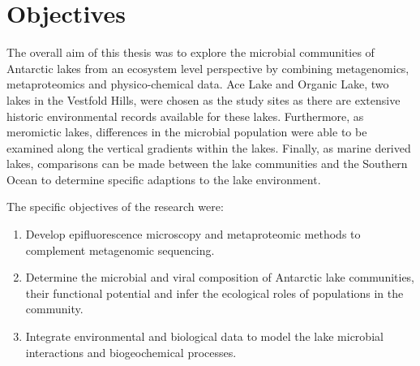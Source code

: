 
\section{Objectives}
The overall aim of this thesis was to explore the microbial communities of Antarctic lakes from an ecosystem level perspective by combining metagenomics, metaproteomics and physico-chemical data.
Ace Lake and Organic Lake, two lakes in the Vestfold Hills, were chosen as the study sites as there are extensive historic environmental records available for these lakes.
Furthermore, as meromictic lakes, differences in the microbial population were able to be examined along the vertical gradients within the lakes.
Finally, as marine derived lakes, comparisons can be made between the lake communities and the Southern Ocean to determine specific adaptions to the lake environment.

The specific objectives of the research were:

\begin{enumerate}
\item 
  Develop epifluorescence microscopy and metaproteomic methods to complement metagenomic sequencing.

\item
  Determine the microbial and viral composition of Antarctic lake communities, their functional potential and infer the ecological roles of populations in the community.

\item
  Integrate environmental and biological data to model the lake microbial interactions and biogeochemical processes.

\end{enumerate}
